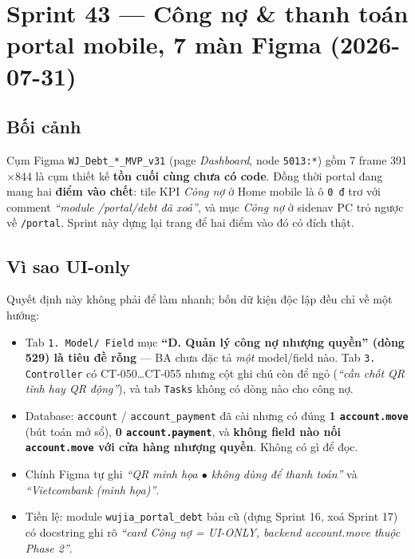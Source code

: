 \chapter{Sprint 43 --- Công nợ \& thanh toán portal mobile, 7 màn Figma (2026-07-31)}

\section{Bối cảnh}

Cụm Figma \texttt{WJ\_Debt\_*\_MVP\_v31} (page \emph{Dashboard}, node \texttt{5013:*}) gồm 7 frame
391$\times$844 là cụm thiết kế \textbf{tồn cuối cùng chưa có code}. Đồng thời portal đang mang hai
\textbf{điểm vào chết}: tile KPI \emph{Công nợ} ở Home mobile là ô \texttt{0 đ} trơ với comment
\emph{``module /portal/debt đã xoá''}, và mục \emph{Công nợ} ở sidenav PC trỏ ngược về
\texttt{/portal}. Sprint này dựng lại trang để hai điểm vào đó có đích thật.

\section{Vì sao UI-only}

Quyết định này không phải để làm nhanh; bốn dữ kiện độc lập đều chỉ về một hướng:

\begin{itemize}
  \item Tab \texttt{1. Model/ Field} mục \textbf{``D. Quản lý công nợ nhượng quyền'' (dòng 529) là
    tiêu đề rỗng} --- BA chưa đặc tả \emph{một} model/field nào. Tab \texttt{3. Controller} có
    CT-050\ldots CT-055 nhưng cột ghi chú còn để ngỏ (\emph{``cần chốt QR tĩnh hay QR động''}), và
    tab \texttt{Tasks} không có dòng nào cho công nợ.
  \item Database: \texttt{account} / \texttt{account\_payment} đã cài nhưng có đúng \textbf{1
    \texttt{account.move}} (bút toán mở sổ), \textbf{0 \texttt{account.payment}}, và \textbf{không
    field nào nối \texttt{account.move} với cửa hàng nhượng quyền}. Không có gì để đọc.
  \item Chính Figma tự ghi \emph{``QR minh họa $\bullet$ không dùng để thanh toán''} và
    \emph{``Vietcombank (minh họa)''}.
  \item Tiền lệ: module \texttt{wujia\_portal\_debt} bản cũ (dựng Sprint 16, xoá Sprint 17) có
    docstring ghi rõ \emph{``card Công nợ = UI-ONLY, backend account.move thuộc Phase 2''}.
\end{itemize}

